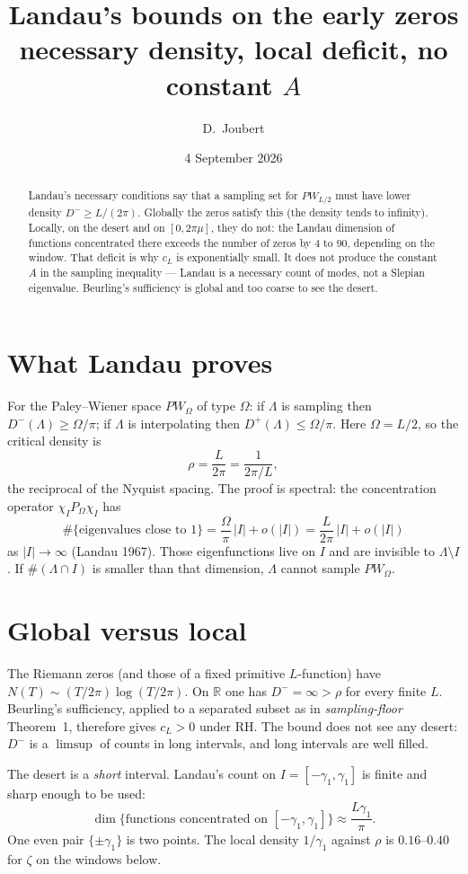 \documentclass[11pt]{article}
\title{Landau's bounds on the early zeros\\
\large necessary density, local deficit, no constant $A$}
\author{D.\ Joubert}
\date{4 September 2026}
\begin{document}
\maketitle
\begin{abstract}
\noindent
Landau's necessary conditions say that a sampling set for
$PW_{L/2}$ must have lower density $D^-\ge L/(2\pi)$. Globally the
zeros satisfy this (the density tends to infinity). Locally, on
the desert and on $[0,2\pi\mu]$, they do not: the Landau dimension
of functions concentrated there exceeds the number of zeros by
$4$ to $90$, depending on the window. That deficit is why $c_L$
is exponentially small. It does not produce the constant $A$ in
the sampling inequality --- Landau is a necessary count of modes,
not a Slepian eigenvalue. Beurling's sufficiency is global and
too coarse to see the desert.
\end{abstract}

\section{What Landau proves}
For the Paley--Wiener space $PW_\Omega$ of type $\Omega$:
if $\Lambda$ is sampling then $D^-(\Lambda)\ge\Omega/\pi$;
if $\Lambda$ is interpolating then $D^+(\Lambda)\le\Omega/\pi$.
Here $\Omega=L/2$, so the critical density is
\[
\rho=\frac{L}{2\pi}=\frac1{2\pi/L},
\]
the reciprocal of the Nyquist spacing. The proof is spectral:
the concentration operator $\chi_I P_\Omega\chi_I$ has
\[
\#\{\text{eigenvalues close to }1\}
=\frac\Omega\pi\,|I|+o(|I|)
=\frac{L}{2\pi}\,|I|+o(|I|)
\]
as $|I|\to\infty$ (Landau 1967). Those eigenfunctions live on $I$
and are invisible to $\Lambda\setminus I$. If
$\#(\Lambda\cap I)$ is smaller than that dimension, $\Lambda$
cannot sample $PW_\Omega$.

\section{Global versus local}
The Riemann zeros (and those of a fixed primitive $L$-function)
have $N(T)\sim (T/2\pi)\log(T/2\pi)$. On $\mathbb{R}$ one has
$D^-=\infty>\rho$ for every finite $L$. Beurling's sufficiency,
applied to a separated subset as in \emph{sampling-floor}
Theorem~1, therefore gives $c_L>0$ under RH. The bound does not
see any desert: $D^-$ is a $\limsup$ of counts in long intervals,
and long intervals are well filled.

The desert is a \emph{short} interval. Landau's count on
$I=[-\gamma_1,\gamma_1]$ is finite and sharp enough to be used:
\[
\dim\{\text{functions concentrated on }[-\gamma_1,\gamma_1]\}
\approx\frac{L\gamma_1}{\pi}.
\]
One even pair $\{\pm\gamma_1\}$ is two points. The local density
$1/\gamma_1$ against $\rho$ is $0.16$--$0.40$ for $\zeta$ on the
windows below.
\end{document}
